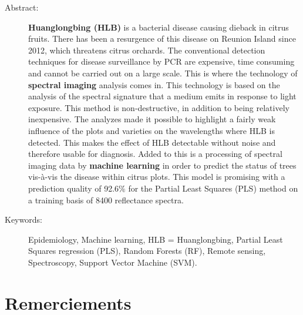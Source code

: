 \documentclass[
  11pt,
  french,
  a4paper,
  extrafontsizes,onecolumn,openright
  ]{memoir}
\begin{document}
\begin{description}
\item[Abstract:]
\textbf{Huanglongbing (HLB)} is a bacterial disease causing dieback in citrus fruits. There has been a resurgence of this disease on Reunion Island since 2012, which threatens citrus orchards. The conventional detection techniques for disease surveillance by PCR are expensive, time consuming and cannot be carried out on a large scale. This is where the technology of \textbf{spectral imaging} analysis comes in. This technology is based on the analysis of the spectral signature that a medium emits in response to light exposure. This method is non-destructive, in addition to being relatively inexpensive. The analyzes made it possible to highlight a fairly weak influence of the plots and varieties on the wavelengths where HLB is detected. This makes the effect of HLB detectable without noise and therefore usable for diagnosis. Added to this is a processing of spectral imaging data by \textbf{machine learning} in order to predict the status of trees vis-à-vis the disease within citrus plots. This model is promising with a prediction quality of 92.6\% for the Partial Least Squares (PLS) method on a training basis of 8400 reflectance spectra.

\item[Keywords:]
Epidemiology, Machine learning, HLB = Huanglongbing, Partial Least Squares regression (PLS), Random Forests (RF), Remote sensing, Spectroscopy, Support Vector Machine (SVM).

\cleardoublepage
\end{description}








\LargeMargins
{
\hypersetup{linkcolor=}
\setcounter{tocdepth}{3}
\tableofcontents
}



\LargeMargins
\hypertarget{remerciements}{%
\chapter*{Remerciements}\label{remerciements}}
\end{document}
